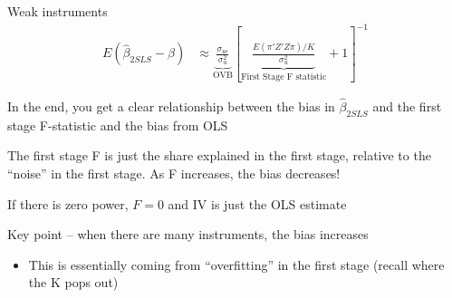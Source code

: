 \documentclass[notes,11pt, aspectratio=169]{beamer}
\newenvironment{wideitemize}{\itemize\addtolength{\itemsep}{10pt}}{\enditemize}
\begin{document}
\begin{frame}{Weak instruments}
    \begin{align*}
      E(\hat{\beta}_{2SLS} - \beta) &\approx \underbrace{\frac{\sigma_{u\epsilon}}{\sigma^{2}_{u}}}_{\text{OVB}}\left[\underbrace{\frac{E(\pi'Z'Z\pi)/K}{\sigma^{2}_{u}}}_{\text{First Stage  F statistic}} + 1\right]^{-1}
    \end{align*}
  \begin{wideitemize}
  \item In the end, you get a clear relationship between the bias in
    $\hat{\beta}_{2SLS}$ and the first stage F-statistic and the bias from OLS
  \item The first stage F is just the share explained in the first
    stage, relative to the ``noise'' in the first stage. As F increases, the bias decreases!
  \item If there is zero power, $F = 0$ and IV is just the OLS estimate
  \item Key point -- when there are many instruments, the bias increases
    \begin{itemize}
    \item This is essentially coming from ``overfitting'' in the first
      stage (recall where the K pops out)
    \end{itemize}
  \end{wideitemize}
\end{frame}
\end{document}
